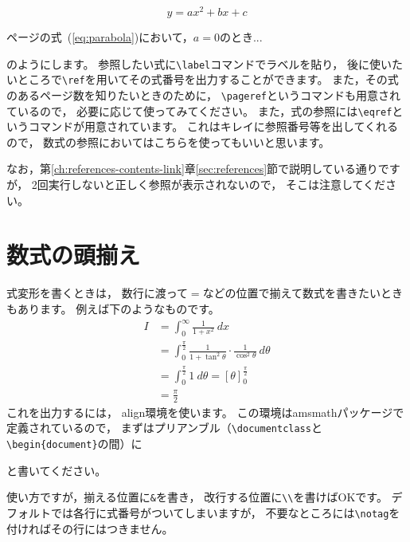 \documentclass[class=jreport, crop=false, preview=false, dvipdfmx, fleqn]{standalone}
\begin{document}
\begin{IOTeX}
\begin{equation}
y = ax^2 + bx + c \label{eq:parabola}
\end{equation}

\pageref{eq:parabola}ページの式~(\ref{eq:parabola})において，$a=0$のとき...
\end{IOTeX}

のようにします。
参照したい式に\verb|\label|コマンドでラベルを貼り，
後に使いたいところで\verb|\ref|を用いてその式番号を出力することができます。
また，その式のあるページ数を知りたいときのために，
\verb|\pageref|というコマンドも用意されているので，
必要に応じて使ってみてください。
また，式の参照には\verb|\eqref|というコマンドが用意されています。
これはキレイに参照番号等を出してくれるので，
数式の参照においてはこちらを使ってもいいと思います。

なお，第\ref{ch:references-contents-link}章\ref{sec:references}節で説明している通りですが，
2回実行しないと正しく参照が表示されないので，
そこは注意してください。




\section{数式の頭揃え}
\label{sec:align}

式変形を書くときは，
数行に渡って$=$などの位置で揃えて数式を書きたいときもあります。
例えば下のようなものです。
\begin{align*}
I & = \int_0^{\infty} \frac{1}{1 + x^2} \ dx \\
	& = \int_0^{\frac{\pi}{2}} \frac{1}{1 + \tan^2 \theta} \cdot \frac{1}{\cos^2 \theta} \ d\theta \\
	& = \int_0^{\frac{\pi}{2}} 1 \ d\theta = \left[ \theta \right]_0^{\frac{\pi}{2}} \\
	& = \frac{\pi}{2}
\end{align*}
これを出力するには，
align環境を使います。
この環境はamsmathパッケージで定義されているので，
まずはプリアンブル（\verb|\documentclass|と\verb|\begin{document}|の間）に
\begin{ITeX}
\usepackage{amsmath}
\end{ITeX}
と書いてください。

使い方ですが，揃える位置に\verb|&|を書き，
改行する位置に\verb|\\|を書けばOKです。
デフォルトでは各行に式番号がついてしまいますが，
不要なところには\verb|\notag|を付ければその行にはつきません。
\end{document}
